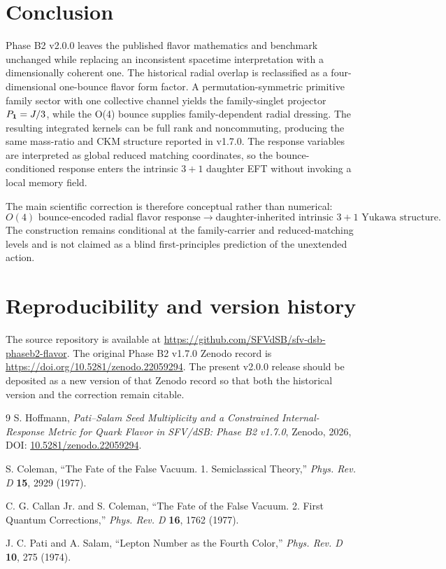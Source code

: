 \documentclass[11pt]{article}
\newcommand{\GitHubURL}{https://github.com/SFVdSB/sfv-dsb-phaseb2-flavor}
\newcommand{\OldDOI}{10.5281/zenodo.22059294}
\begin{document}
\section{Conclusion}
Phase B2 v2.0.0 leaves the published flavor mathematics and benchmark unchanged while replacing an inconsistent spacetime interpretation with a dimensionally coherent one. The historical radial overlap is reclassified as a four-dimensional one-bounce flavor form factor. A permutation-symmetric primitive family sector with one collective channel yields the family-singlet projector $P_{\bf1}=J/3$, while the O(4) bounce supplies family-dependent radial dressing. The resulting integrated kernels can be full rank and noncommuting, producing the same mass-ratio and CKM structure reported in v1.7.0. The response variables are interpreted as global reduced matching coordinates, so the bounce-conditioned response enters the intrinsic $3+1$ daughter EFT without invoking a local memory field.

The main scientific correction is therefore conceptual rather than numerical:
\begin{equation}
\boxed{
\text{$O(4)$ bounce-encoded radial flavor response}
\longrightarrow
\text{daughter-inherited intrinsic $3+1$ Yukawa structure}.}
\end{equation}
The construction remains conditional at the family-carrier and reduced-matching levels and is not claimed as a blind first-principles prediction of the unextended action.

\section*{Reproducibility and version history}
The source repository is available at \url{\GitHubURL}. The original Phase B2 v1.7.0 Zenodo record is \url{https://doi.org/\OldDOI}. The present v2.0.0 release should be deposited as a new version of that Zenodo record so that both the historical version and the correction remain citable.

\begin{thebibliography}{9}
S. Hoffmann, \emph{Pati--Salam Seed Multiplicity and a Constrained Internal-Response Metric for Quark Flavor in SFV/dSB: Phase B2 v1.7.0}, Zenodo, 2026, DOI: \href{https://doi.org/10.5281/zenodo.22059294}{10.5281/zenodo.22059294}.

S. Coleman, ``The Fate of the False Vacuum. 1. Semiclassical Theory,'' \emph{Phys. Rev. D} \textbf{15}, 2929 (1977).

C. G. Callan Jr. and S. Coleman, ``The Fate of the False Vacuum. 2. First Quantum Corrections,'' \emph{Phys. Rev. D} \textbf{16}, 1762 (1977).

J. C. Pati and A. Salam, ``Lepton Number as the Fourth Color,'' \emph{Phys. Rev. D} \textbf{10}, 275 (1974).
\end{thebibliography}
\end{document}

